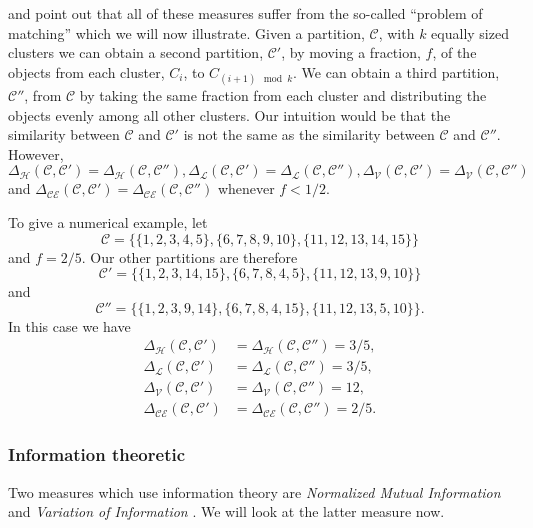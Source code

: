 \documentclass[a4paper]{report}
\newcommand{\clus}{\mathcal{C}}
\newcommand{\partcomparep}[1]{\Delta_{\mathcal{#1}}(\clus,\clus')}
\newcommand{\partcomparepp}[1]{\Delta_{\mathcal{#1}}(\clus,\clus'')}
\begin{document}
\citet{meila-2007} and \citet{bae2010comparison} point out that all of these
measures suffer from the so-called ``problem of matching'' which we will now
illustrate.  Given a partition, $\clus$, with $k$ equally sized clusters we
can obtain a second partition, $\clus'$, by moving a fraction, $f$, of the
objects from each cluster, $C_{i}$, to $C_{(i+1) \mod k}$.  We can obtain a
third partition, $\clus''$, from $\clus$ by taking the same fraction from each
cluster and distributing the objects evenly among all other clusters.  Our
intuition would be that the similarity between $\clus$ and $\clus'$ is not the
same as the similarity between $\clus$ and $\clus''$.  However,
$\partcomparep{H} = \partcomparepp{H}, \partcomparep{L}
= \partcomparepp{L}, \partcomparep{V} = \partcomparepp{V}$ and
$\partcomparep{CE} = \partcomparepp{CE}$ whenever $f < 1/2$.

To give a numerical example, let
\begin{equation*}
  \clus = \{\{1,2,3,4,5\},\{6,7,8,9,10\},\{11,12,13,14,15\}\}
\end{equation*}
and $f = 2/5$.  Our other partitions are therefore
\begin{equation*}
\clus' = \{\{1,2,3,14,15\},\{6,7,8,4,5\},\{11,12,13,9,10\}\}
\end{equation*}
and
\begin{equation*}
\clus'' = \{\{1,2,3,9,14\},\{6,7,8,4,15\},\{11,12,13,5,10\}\}.
\end{equation*}
In this case we have
\begin{align*}
  \partcomparep{H} &= \partcomparepp{H} = 3/5,\\
  \partcomparep{L} &= \partcomparepp{L} = 3/5,\\
  \partcomparep{V} &= \partcomparepp{V} = 12,\\
  \partcomparep{CE} &= \partcomparepp{CE} = 2/5.
\end{align*}


\subsubsection{Information theoretic}
\label{sec:inform-theor}

Two measures which use information theory are \textit{Normalized Mutual
  Information} \citep{fred-jain-2003} and \textit{Variation of Information}
\citep{meila-2007}.  We will look at the latter measure now.
\end{document}
